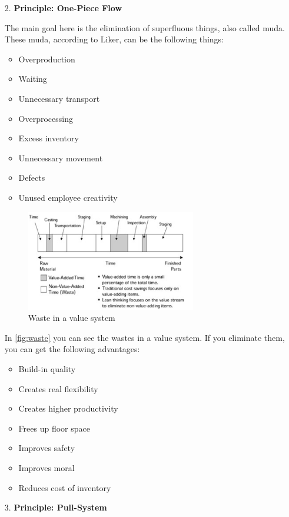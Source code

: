 \documentclass[11pt,a4paper]{article}
\begin{document}
\begin{enumerate}
\item[2.] \textbf{Principle: One-Piece Flow}

  The main goal here is the elimination of superfluous things, also called
  muda. These muda, according to Liker, can be the following things:
  \begin{itemize}[noitemsep]
  \item Overproduction
  \item Waiting
  \item Unnecessary transport
  \item Overprocessing
  \item Excess inventory
  \item Unnecessary movement
  \item Defects
  \item Unused employee creativity
  \end{itemize}
  \begin{figure}[h] 
    \centering
    \includegraphics[width=0.7\textwidth]{waste.PNG}
    \caption{Waste in a value system}
    \label{fig:waste}
  \end{figure}
    
  In \autoref{fig:waste} you can see the wastes in a value system. If you
  eliminate them, you can get the following advantages:
  \begin{itemize}[noitemsep]
  \item Build-in quality
  \item Creates real flexibility
  \item Creates higher productivity
  \item Frees up floor space
  \item Improves safety
  \item Improves moral
  \item Reduces cost of inventory
  \end{itemize}
    
\item[3.] \textbf{Principle: Pull-System}
  

\end{enumerate}
\end{document}
